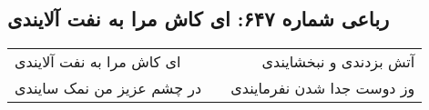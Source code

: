 \begin{center}
\section*{رباعی شماره ۶۴۷: ای کاش مرا به نفت آلایندی}
\label{sec:sh647}
\begin{longtable}{l p{0.5cm} r}
ای کاش مرا به نفت آلایندی
&&
آتش بزدندی و نبخشایندی
\\
در چشم عزیز من نمک سایندی
&&
وز دوست جدا شدن نفرمایندی
\\
\end{longtable}
\end{center}
